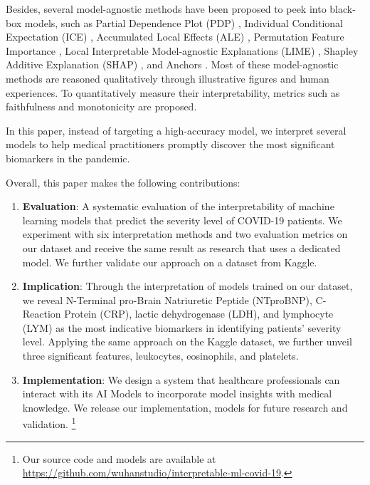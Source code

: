 Besides, several model-agnostic methods have been proposed to peek into black-box models, such as Partial Dependence Plot (PDP) \citep{Friedman2001GreedyFA}, Individual Conditional Expectation (ICE) \citep{goldstein2013peeking}, Accumulated Local Effects (ALE) \citep{apley2016visualizing}, Permutation Feature Importance \citep{fisher2018models}, Local Interpretable Model-agnostic Explanations (LIME) \citep{ribeiro2016i}, Shapley Additive Explanation (SHAP) \citep{lundberg2017unified}, and Anchors \citep{Ribeiro2018AnchorsHM}. Most of these model-agnostic methods are reasoned qualitatively through illustrative figures and human experiences. To quantitatively measure their interpretability, metrics such as faithfulness \citep{alvarezmelis2018robust} and monotonicity \citep{luss2019generating} are proposed.

In this paper, instead of targeting a high-accuracy model, we interpret several models to help medical practitioners promptly discover the most significant biomarkers in the pandemic.

Overall, this paper makes the following contributions:

\begin{enumerate}
    \item \textbf{Evaluation}: A systematic evaluation of the interpretability of machine learning models that predict the severity level of COVID-19 patients. We experiment with six interpretation methods and two evaluation metrics on our dataset and receive the same result as research that uses a dedicated model. We further validate our approach on a dataset from Kaggle.

    \item \textbf{Implication}: Through the interpretation of models trained on our dataset, we reveal N-Terminal pro-Brain Natriuretic Peptide (NTproBNP), C-Reaction Protein (CRP), lactic dehydrogenase (LDH), and lymphocyte (LYM) as the most indicative biomarkers in identifying patients' severity level. Applying the same approach on the Kaggle dataset, we further unveil three significant features, leukocytes, eosinophils, and platelets.

    \item \textbf{Implementation}: We design a system that healthcare professionals can interact with its AI Models to incorporate model insights with medical knowledge. We release our implementation, models for future research and validation. \footnote{Our source code and models are available at \url{https://github.com/wuhanstudio/interpretable-ml-covid-19}.}
\end{enumerate}

